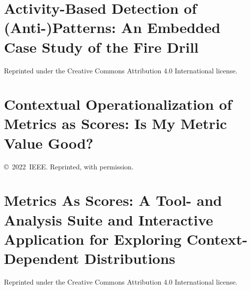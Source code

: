\begin{appendices}
\chapter{Activity-Based Detection of (Anti-)Patterns: An Embedded Case Study of the Fire Drill}\label{app:publ-honel2023embedded}
\chaptermark{\label{app:publ-honel2023embedded}}

\vspace{10pt}
\noindent
{\footnotesize Reprinted under the Creative Commons Attribution 4.0 International license.}




\renewcommand{\appendixname}{Paper}
\chapter{Contextual Operationalization of Metrics as Scores: Is My Metric Value Good?}\label{app:publ-honel2022qrsmas}
\chaptermark{\label{app:publ-honel2022qrsmas}}

\vspace{10pt}
\noindent
{\footnotesize\copyright~2022~{IEEE}. Reprinted, with permission.}




\renewcommand{\appendixname}{Article}
\chapter{Metrics As Scores: A Tool- and Analysis Suite and Interactive Application for Exploring Context-Dependent Distributions}\label{app:publ-honel2023masjoss}
\chaptermark{\label{app:publ-honel2023masjoss}}

\vspace{10pt}
\noindent
{\footnotesize Reprinted under the Creative Commons Attribution 4.0 International license.}




\end{appendices}